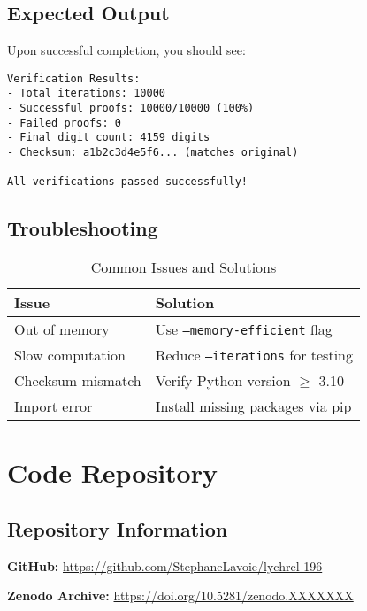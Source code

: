 \documentclass[11pt,a4paper]{article}
\newcommand{\code}[1]{\texttt{#1}}
\begin{document}
\subsection{Expected Output}

Upon successful completion, you should see:

\begin{lstlisting}[style=bashstyle]
Verification Results:
- Total iterations: 10000
- Successful proofs: 10000/10000 (100%)
- Failed proofs: 0
- Final digit count: 4159 digits
- Checksum: a1b2c3d4e5f6... (matches original)

All verifications passed successfully!
\end{lstlisting}

\subsection{Troubleshooting}

\begin{table}[H]
\centering
\caption{Common Issues and Solutions}
\begin{tabular}{@{}p{5cm}p{7cm}@{}}
\toprule
\textbf{Issue} & \textbf{Solution} \\
\midrule
Out of memory & Use \code{--memory-efficient} flag \\
Slow computation & Reduce \code{--iterations} for testing \\
Checksum mismatch & Verify Python version $\geq$ 3.10 \\
Import error & Install missing packages via pip \\
\bottomrule
\end{tabular}
\end{table}

\section{Code Repository}

\subsection{Repository Information}

\textbf{GitHub:} \url{https://github.com/StephaneLavoie/lychrel-196}

\textbf{Zenodo Archive:} \url{https://doi.org/10.5281/zenodo.XXXXXXX}
\end{document}
